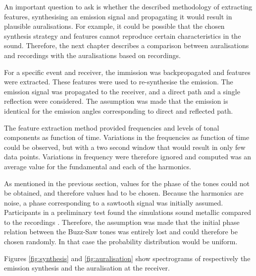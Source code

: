 An important question to ask is whether the described methodology of extracting
features, synthesising an emission signal and propagating it would result in
plausible auralisations. For example, it could be possible that the chosen
synthesis strategy and features cannot reproduce certain characteristics in the
sound. Therefore, the next chapter describes a comparison between auralisations
and recordings with the auralisations based on recordings.

For a specific event and receiver, the immission was backpropagated and features
were extracted. These features were used to re-synthesise the emission. The
emission signal was propagated to the receiver, and a direct path and a single
reflection were considered. The assumption was made that the emission is
identical for the emission angles corresponding to direct and reflected path.

The feature extraction method provided frequencies and levels of tonal
components as function of time. Variations in the frequencies as function of
time could be observed, but with a two second window that would result in only
few data points. Variations in frequency were therefore ignored and computed was an
average value for the fundamental and each of the harmonics.

As mentioned in the previous section, values for the phase of the tones could
not be obtained, and therefore values had to be chosen. Because the harmonics
are  noise, a phase corresponding to a sawtooth signal was
initially assumed. Participants in a preliminary test found the simulations
sound metallic compared to the recordings \cite{Rietdijk2016a}. Therefore, the
assumption was made that the initial phase relation between the Buzz-Saw tones
was entirely lost and could therefore be chosen randomly. In that case the
probability distribution would be uniform.

Figures \ref{fig:synthesis} and \ref{fig:auralisation} show spectrograms of
respectively the emission synthesis and the auralisation at the receiver.

\newpage
{}


